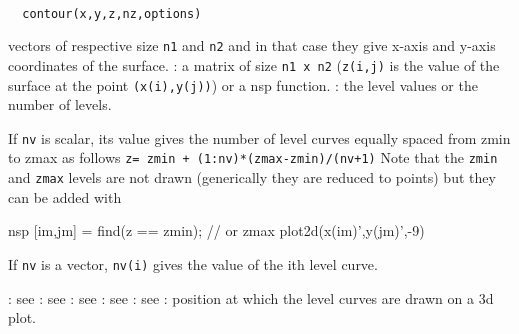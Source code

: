 
\begin{mandesc}
  \\ %
\end{mandesc}
\begin{calling_sequence}
\begin{verbatim}
  contour(x,y,z,nz,options)
\end{verbatim}
\end{calling_sequence}

\begin{parameters}
  \begin{varlist}
     vectors of respective size \verb!n1! and \verb!n2! and in that case they give x-axis
    and y-axis coordinates of the surface.
    :  a matrix of size \verb!n1 x n2! (\verb!z(i,j)! is the
    value of the surface at the point \verb!(x(i),y(j))!) or a nsp function.
    : the level values or the number of levels.
    \begin{varlist}
      \vname{-}If \verb!nv! is scalar, its value gives the
      number of level curves equally spaced from zmin to zmax as
      follows \verb!z= zmin + (1:nv)*(zmax-zmin)/(nv+1)!
      Note that the \verb!zmin! and \verb!zmax!
      levels are not drawn (generically they are reduced to points)
      but they can be added with
      \begin{mintednsp}{nsp}
        [im,jm] = find(z == zmin); // or zmax
        plot2d(x(im)',y(jm)',-9)
      \end{mintednsp}
      \vname{-}If \verb!nv! is a vector, \verb!nv(i)! gives
      the value of the ith level curve.
    \end{varlist}
    : see 
    : see 
    : see 
    : see 
    : see 
    : position at which the level curves are drawn on a 3d plot.
  \end{varlist}
\end{parameters}

